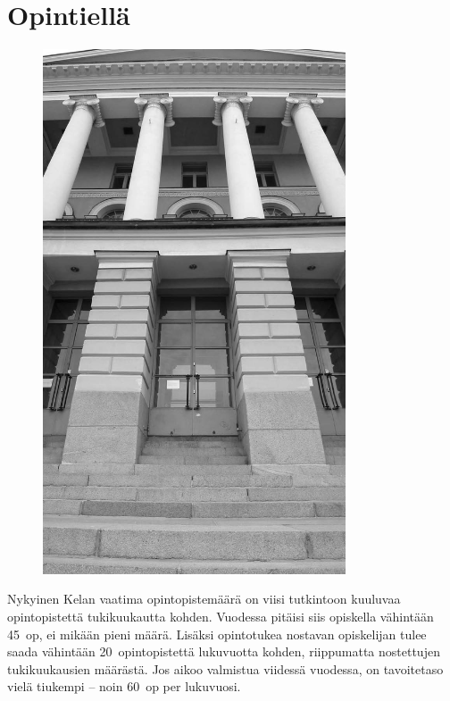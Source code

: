 \documentclass[a5paper, 8pt, twocolumn]{book} %
\numberwithin{equation}{section}
\begin{document}
\chapter{Opintiellä}
\begin{figure}
	\centering
	\includegraphics[width=0.8\textwidth]{hypaarakennus.png}
\end{figure}

Nykyinen Kelan vaatima opinto\-piste\-määrä
on viisi tutkintoon kuuluvaa opinto\-pistettä
tuki\-kuukautta kohden. Vuodessa
pitäisi siis opiskella vähintään 45~op, ei mikään
pieni määrä. Lisäksi opinto\-tukea nostavan
opiskelijan tulee saada vähintään 20~opinto\-pistettä lukuvuotta kohden, riippumatta
nostettujen tukikuukausien määrästä.
Jos aikoo valmistua viidessä vuodessa, on tavoitetaso vielä tiukempi -- noin 60~op per lukuvuosi.
\end{document}
